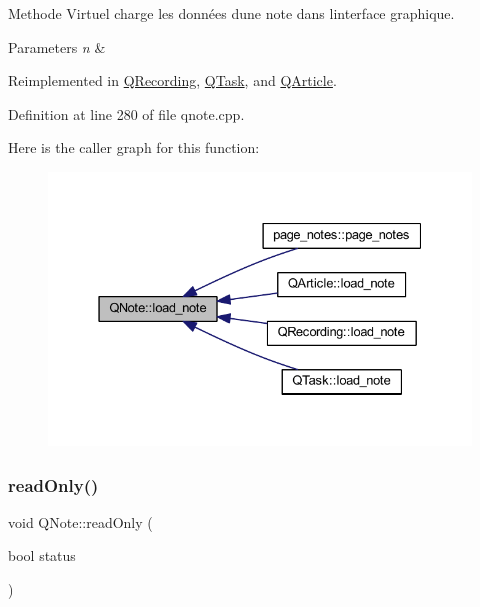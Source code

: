 Methode Virtuel charge les données d\textquotesingle{}une note dans l\textquotesingle{}interface graphique. 


\begin{DoxyParams}{Parameters}
{\em n} & \\
\hline
\end{DoxyParams}


Reimplemented in \hyperlink{class_q_recording_aa6984351b5a0bceaa63be793b160c73b}{Q\+Recording}, \hyperlink{class_q_task_a548fc51beaa1dcea345c362782aa11c0}{Q\+Task}, and \hyperlink{class_q_article_aea21c10581abe74709317283739e9552}{Q\+Article}.



Definition at line 280 of file qnote.\+cpp.

Here is the caller graph for this function\+:\nopagebreak
\begin{figure}[H]
\begin{center}
\leavevmode
\includegraphics[width=331pt]{class_q_note_adca0a8f2851fbb1c3843ca4fe7957c11_icgraph}
\end{center}
\end{figure}
\mbox{\label{class_q_note_ae6fb14b839acc1979b145a892d6a0a92}} 
\subsubsection{\texorpdfstring{read\+Only()}{readOnly()}}
{\footnotesize\ttfamily void Q\+Note\+::read\+Only (\begin{DoxyParamCaption}\item[{bool}]{status }\end{DoxyParamCaption})\hspace{0.3cm}{\ttfamily [virtual]}}



